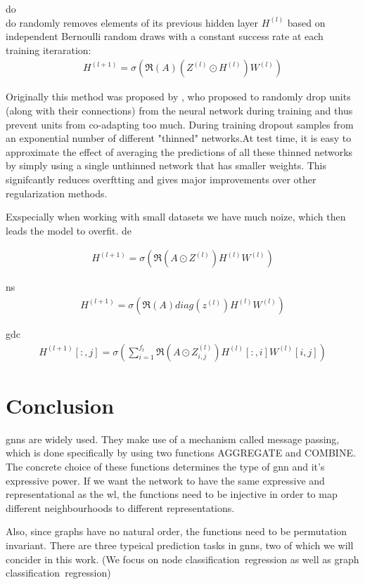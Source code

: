
\ac{do}\\
\ac{do} randomly removes elements of its previous hidden
layer $H^{(l)}$ based on independent Bernoulli random draws
with a constant success rate at each training iteraration: \cite{DBLP:journals/corr/abs-2006-04064}
\begin{align*}
    H^{(l+1)} = \sigma(\mathfrak{R}(A)(Z^{(l)}\odot H^{(l)}) W^{(l)})
\end{align*}


Originally this method was proposed by \cite{Srivastava2014}, who proposed to
randomly drop units (along with their connections) from the neural
network during training and thus prevent units from co-adapting too much.
During training dropout samples from an exponential number of different "thinned" networks.At
test time, it is easy to approximate the effect of averaging the predictions of all these thinned networks
by simply using a single unthinned network that has smaller weights. This signifcantly
reduces overftting and gives major improvements over other regularization methods.

Exspecially when working with small datasets we have much noize, which then leads the model
to overfit.
\ac{de}

\begin{align*}
    H^{(l+1)} = \sigma(\mathfrak{R}(A \odot Z^{(l)}) H^{(l)} W^{(l)})
\end{align*}

\ac{ns}
\begin{align*}
    H^{(l+1)} = \sigma (\mathfrak{R}(A) diag(z^{(l)}) H^{(l)} W^{(l)})
\end{align*}

\ac{gdc}
\begin{align*}
    H^{(l+1)}[:,j] = \sigma (\sum_{i=1}^{f_{t}}\mathfrak{R}(A \odot Z_{i,j}^{(l)})H^{(l)}[:,i]W^{(l)}[i,j])
\end{align*}

\section{Conclusion}
\label{sec:related:conclusion}
\acp{gnn} are widely used. They make use of a mechanism called message passing, which
is done specifically by using two functions AGGREGATE and COMBINE.
The concrete choice of these functions determines the type of \ac{gnn}
and it's expressive power. If we want the network to have the same expressive
and representational as the \ac{wl}, the functions need to be injective in order
to map different neighbourhoods to different representations.

Also, since graphs have no natural order, the functions need to be permutation
invariant.
There are three typeical prediction tasks in \acp{gnn}, two of which we will concider
in this work. (We focus on node classification\ regression as well as
graph classification\ regression)